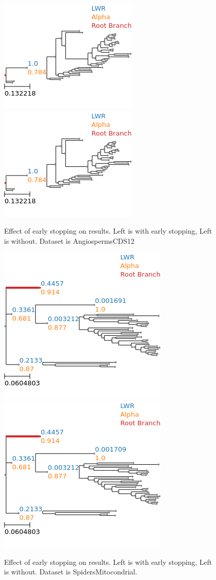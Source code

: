 \documentclass{article}
\begin{document}
\begin{figure}[H]
  \begin{center}
    \includegraphics[width=.4\linewidth]{figs/early_stop_tests/es_test_cds12_no_outgroup.png}
    \includegraphics[width=.4\linewidth]{figs/early_stop_tests/es_test_cds12_no_outgroup_noes.png}
    \caption{Effect of early stopping on results. Left is with early stopping,
    Left is without. Dataset is AngiospermsCDS12}
  \end{center}
\end{figure}
\begin{figure}[H]
  \begin{center}
    \includegraphics[width=.4\linewidth]{figs/early_stop_tests/es_test_mito_no_outgroup.png}
    \includegraphics[width=.4\linewidth]{figs/early_stop_tests/es_test_mito_no_outgroup_noes.png}
    \caption{Effect of early stopping on results. Left is with early stopping,
    Left is without. Dataset is SpidersMitocondrial.}
  \end{center}
\end{figure}
\end{document}
